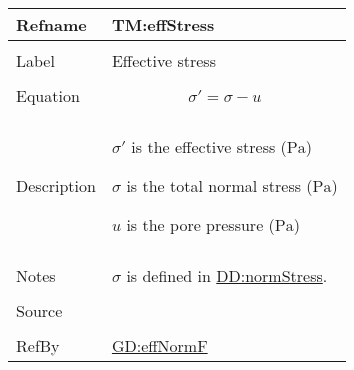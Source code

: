 \documentclass[12pt]{article}
\begin{document}
\vspace{\baselineskip}
\noindent
\begin{minipage}{\textwidth}
\begin{tabular}{>{\raggedright}p{}>{\raggedright\arraybackslash}p{}}
\toprule \textbf{Refname} & \textbf{TM:effStress}
\label{TM:effStress}
\\ \midrule \\
Label & Effective stress
        
\\ \midrule \\
Equation & \begin{displaymath}
           σ'=σ-u
           \end{displaymath}
\\ \midrule \\
Description & \begin{symbDescription}
              \item{$σ'$ is the effective stress (${\text{Pa}}$)}
              \item{$σ$ is the total normal stress (${\text{Pa}}$)}
              \item{$u$ is the pore pressure (${\text{Pa}}$)}
              \end{symbDescription}
\\ \midrule \\
Notes & $σ$ is defined in \hyperref[DD:normStress]{DD:normStress}.
        
\\ \midrule \\
Source & \cite{fredlund1977}
         
\\ \midrule \\
RefBy & \hyperref[GD:effNormF]{GD:effNormF}
        
\\ \bottomrule
\end{tabular}
\end{minipage}
\vspace{\baselineskip}
\noindent
\end{document}
